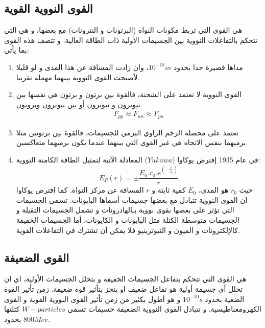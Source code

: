  \subsection{ القوى النووية القوية}
هي القوى التي تربط مكونات النواة (البرتونات و النترونات) مع بعضها، و هي التي تتحكم بالتفاعلات النووية بين الجسيمات اﻷولية ذات الطاقة العالية. و تتصف هذه القوى بما يأتي:
\begin{enumerate}
	\item مداها قصيرة جدا بحدود $10^{-15}m$، وان زادت المسافة عن هذا المدى و لو قليلا ﻷصبحت القوى النووية بينهما مهملة تقريبا.
	
	\item القوى النووية لا تعتمد على الشحنة، فالقوة بين برتون و برتون هي نفسها بين نيوترون و نيوترون أو بين نيوترون وبروتون.
\begin{gather*} 
	F_{pp} \approx F_{nn} \approx F_{pn}
\end{gather*}

	\item تعتمد على محصلة الزخم الزاوي البرمي للجسيمات، فالقوة بين برتونين مثلا برميهما بنفس الاتجاه هي غير القوى التي بينهما عندما يكون برميهما متعاكسين.
	
	\item 
في عام 1935 إفترض يوكاوا ($Yukawa$) المعادلة اﻵتية لتمثيل الطاقة الكامنة النووية:
\begin{equation}
	E_{P}(r) = \pm \dfrac{E_{0}.r_{0}.e^{(-\frac{r}{r_{0}})}}{r}
\end{equation}
حيث $r_{0}$ هو المدى، $E_{0}$ 
كمية ثابتة و 
$r$
المسافة عن مركز النواة. كما افترض يوكاوا ان القوى النووية تتبادل مع بعضها جسيمات أسماها البايونات. تسمى الجسيمات التي تؤثر على بعضها بقوى نووية بـالهادرونات و تشمل الجسيمات الثقيلة و الجسيمات متوسطة الكتلة مثل البايونات و الكايونات، أما الجسيمات الخفيفة كالإلكترونات و الميون و النيوترينيو فلا يمكن أن تشترك في التفاعلات القوية.
\end{enumerate}

 \subsection{ القوى الضعيفة}
هي القوى التي تتحكم بتفاعل الجسيمات الخفيفة و بتحلل الجسيمات اﻷولية، اي ان تحلل أي جسيمة أولية هو تفاعل ضعيف او ينجز بتأثير قوة ضعيفة. زمن تأثير القوة الضعية بحدود $10^{-10}s$ و هو أطول بكثير من زمن تأثير القوى النووية القوية و القوى الكهرومغناطيسية. و تتبادل القوى النووية الضعيفة جسيمات تسمى $W-particles$ 
كتلتها بحدود $800 Mev$.
